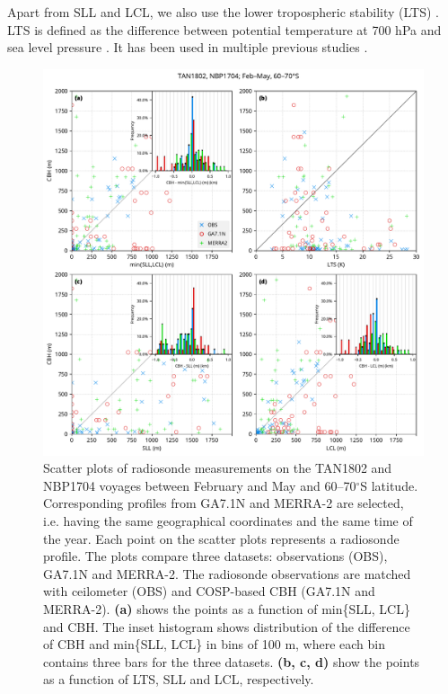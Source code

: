 Apart from SLL and LCL, we also use the lower tropospheric stability (LTS)
\citep{klein1993}. LTS is defined as the difference between potential
temperature at 700 hPa and sea level pressure \citep{klein1993}. It has been
used in multiple previous studies
\citep{williams2006,franklin2013,williams2013,naud2014}. 

\begin{figure}[p]
\centering
\centerline{\includegraphics[width=1.12\textwidth]{chapter2/fig/rs_scatter_rev1.pdf}}
\caption[Scatter plots of radiosonde measurements on the TAN1802 and NBP1704 voyages]{
Scatter plots of radiosonde measurements on the TAN1802 and NBP1704 voyages
between February and May and 60--70$^\circ$S latitude. Corresponding profiles
from GA7.1N and MERRA-2 are selected, i.e. having the same geographical
coordinates and the same time of the year. Each point on the scatter plots
represents a radiosonde profile. The plots compare three datasets: observations
(OBS), GA7.1N and MERRA-2. The radiosonde observations are matched with
ceilometer (OBS) and COSP-based CBH (GA7.1N and MERRA-2). \textbf{(a)} shows the
points as a function of min\{SLL, LCL\} and CBH. The inset histogram shows
distribution of the difference of CBH and min\{SLL, LCL\} in bins of 100
\unit{m}, where each bin contains three bars for the three datasets.
\textbf{(b, c, d)} show the points as a function of LTS, SLL and LCL,
respectively.
}
\label{fig:2:rs-scatter}
\end{figure}

